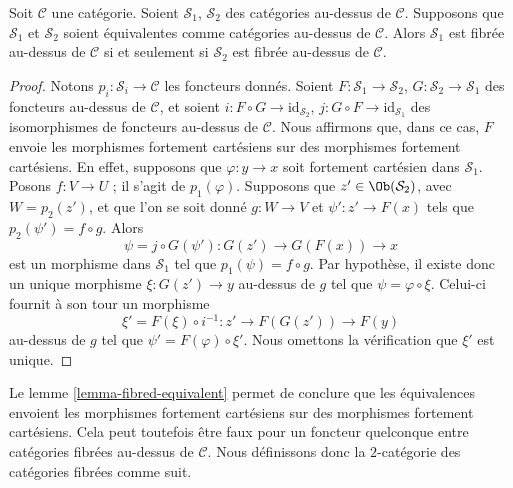 \begin{lemma}
\label{lemma-fibred-equivalent}
Soit $\mathcal{C}$ une catégorie.
Soient $\mathcal{S}_1$, $\mathcal{S}_2$ des catégories au-dessus de
$\mathcal{C}$. Supposons que $\mathcal{S}_1$ et $\mathcal{S}_2$ soient
équivalentes comme catégories au-dessus de $\mathcal{C}$.
Alors $\mathcal{S}_1$ est fibrée au-dessus de $\mathcal{C}$ si et seulement
si $\mathcal{S}_2$ est fibrée au-dessus de $\mathcal{C}$.
\end{lemma}

\begin{proof}
Notons $p_i : \mathcal{S}_i \to \mathcal{C}$ les foncteurs donnés.
Soient $F : \mathcal{S}_1 \to \mathcal{S}_2$,
$G : \mathcal{S}_2 \to \mathcal{S}_1$ des foncteurs au-dessus de
$\mathcal{C}$, et soient
$i : F \circ G \to \text{id}_{\mathcal{S}_2}$,
$j : G \circ F \to \text{id}_{\mathcal{S}_1}$ des isomorphismes de
foncteurs au-dessus de $\mathcal{C}$.
Nous affirmons que, dans ce cas, $F$ envoie les morphismes fortement
cartésiens sur des morphismes fortement cartésiens. En effet, supposons que
$\varphi : y \to x$ soit fortement cartésien dans $\mathcal{S}_1$.
Posons $f : V \to U$ ; il s'agit de $p_1(\varphi)$. Supposons que
$z' \in \Ob(\mathcal{S}_2)$, avec $W = p_2(z')$, et que l'on se soit donné
$g : W \to V$ et $\psi' : z' \to F(x)$ tels que
$p_2(\psi') = f \circ g$. Alors
$$
\psi = j \circ G(\psi') : G(z') \to G(F(x)) \to x
$$
est un morphisme dans $\mathcal{S}_1$ tel que
$p_1(\psi) = f \circ g$.
Par hypothèse, il existe donc un unique morphisme $\xi : G(z') \to y$
au-dessus de $g$ tel que $\psi = \varphi \circ \xi$. Celui-ci fournit à son
tour un morphisme
$$
\xi' = F(\xi) \circ i^{-1} : z' \to F(G(z')) \to F(y)
$$
au-dessus de $g$ tel que $\psi' = F(\varphi) \circ \xi'$. Nous omettons
la vérification que $\xi'$ est unique.
\end{proof}

\noindent
Le lemme \ref{lemma-fibred-equivalent} permet de conclure que les équivalences
envoient les morphismes fortement cartésiens sur des morphismes fortement
cartésiens. Cela peut toutefois être faux pour un foncteur quelconque entre
catégories fibrées au-dessus de $\mathcal{C}$. Nous définissons donc la
$2$-catégorie des catégories fibrées comme suit.

